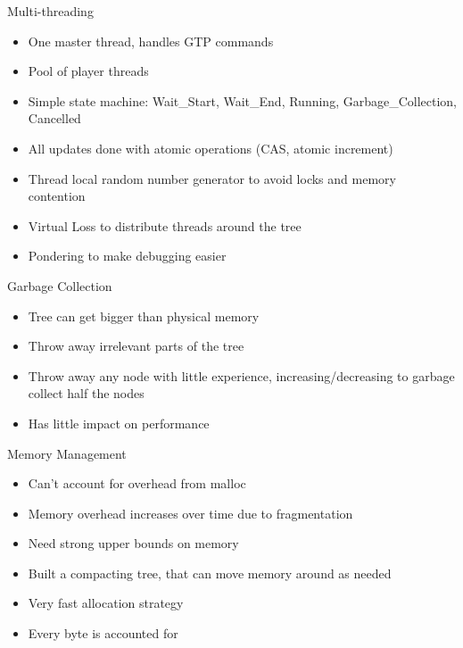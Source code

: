 \documentclass{beamer} %
\begin{document}

\begin{frame}{Multi-threading}
\begin{itemize}
\item One master thread, handles GTP commands
\item Pool of player threads
\item Simple state machine: Wait\_Start, Wait\_End, Running, Garbage\_Collection, Cancelled
\item All updates done with atomic operations (CAS, atomic increment)
\item Thread local random number generator to avoid locks and memory contention
\item Virtual Loss to distribute threads around the tree
\item Pondering to make debugging easier
\end{itemize}
\end{frame}


\begin{frame}{Garbage Collection}
\begin{itemize}
\item Tree can get bigger than physical memory
\item Throw away irrelevant parts of the tree
\item Throw away any node with little experience, increasing/decreasing to garbage collect half the nodes
\item Has little impact on performance
\end{itemize}
\end{frame}

\begin{frame}{Memory Management}
\begin{itemize}
\item Can't account for overhead from malloc
\item Memory overhead increases over time due to fragmentation
\item Need strong upper bounds on memory
\item Built a compacting tree, that can move memory around as needed
\item Very fast allocation strategy
\item Every byte is accounted for
\end{itemize}
\end{frame}
\end{document}
